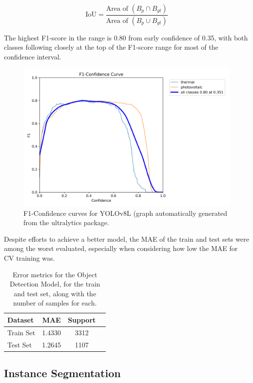 \documentclass[conference]{IEEEtran}
\begin{document}
\[
\text{IoU} = \frac{\text{Area of } (B_p \cap B_{gt})}{\text{Area of } (B_p \cup B_{gt})}
\]

The highest F1-score in the range is 0.80 from early confidence of 0.35, with both classes following closely at the top of the F1-score range for most of the confidence interval.

\begin{figure}[H]
    \centering
    \includegraphics[width=1\linewidth]{assets/model03_yolof1.png}
    \caption{F1-Confidence curves for YOLOv8L (graph automatically generated from the ultralytics package.}
    \label{fig:model03_yolof1}
\end{figure}

Despite efforts to achieve a better model, the MAE of the train and test sets were among the worst evaluated, especially when considering how low the MAE for CV training was.

\begin{table}[H]
\centering
\caption{Error metrics for the Object Detection Model, for the train and test set, along with the number of samples for each.}
\label{tab:model03_results}
\begin{tabular}{lccc}
\toprule
\textbf{Dataset} & \textbf{MAE} & \textbf{Support} \\
\midrule
Train Set & 1.4330 & 3312 \\
Test Set & 1.2645 & 1107 \\
\bottomrule
\end{tabular}
\end{table}

\subsection{Instance Segmentation}
\end{document}

